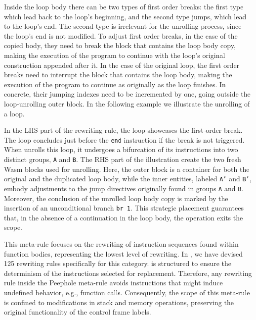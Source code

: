 Inside the loop body there can be two types of first order breaks: the first type which lead back to the loop's beginning, and the second type jumps, which lead to the loop's end.
The second type is irrelevant for the unrolling process, since the loop's end is not modified.
To adjust first order breaks, in the case of the copied body, they need to break the \wasm block that contains the loop body copy, making the execution of the program to continue with the loop's original construction appended after it.
In the case of the original loop, the first order breaks need to interrupt the block that contains the loop body, making the execution of the program to continue as originally as the loop finishes.
In concrete, their jumping indexes need to be incremented by one, going outside the loop-unrolling outer \wasm block.
In the following example we illustrate the unrolling of a loop.



In the LHS part of the rewriting rule, the loop showcases the first-order break.
The loop concludes just before the \texttt{end} instruction if the break is not triggered.
When \tool unrolls this loop, it undergoes a bifurcation of its instructions into two distinct groups, \texttt{A} and \texttt{B}. 
The RHS part of the illustration create the two fresh Wasm blocks used for unrolling. 
Here, the outer block is a container for both the original and the duplicated loop body, while the inner entities, labeled \texttt{A'} and \texttt{B'}, embody adjustments to the jump directives originally found in groups \texttt{A} and \texttt{B}.
Moreover, the conclusion of the unrolled loop body copy is marked by the insertion of an unconditional branch \texttt{br 1}. 
This strategic placement guarantees that, in the absence of a continuation in the loop body, the operation exits the scope.



This meta-rule  focuses on the rewriting of instruction sequences found within function bodies, representing the lowest level of rewriting. 
In \tool, we have devised 125 rewriting rules specifically for this category.
\tool is structured to ensure the determinism of the instructions selected for replacement.
Therefore, any rewriting rule inside the Peephole meta-rule avoids instructions that might induce undefined behavior, e.g., function calls.
Consequently, the scope of this meta-rule is confined to modifications in stack and memory operations, preserving the original functionality of the control frame labels.

